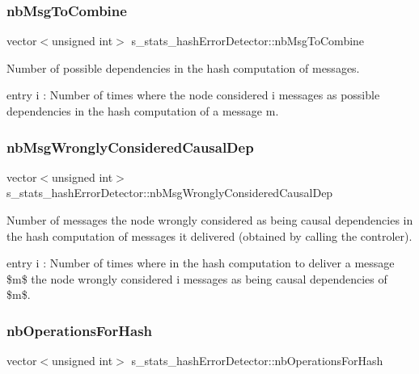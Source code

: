 \subsubsection{\texorpdfstring{nb\+Msg\+To\+Combine}{nbMsgToCombine}}
{\footnotesize\ttfamily vector$<$unsigned int$>$ s\+\_\+stats\+\_\+hash\+Error\+Detector\+::nb\+Msg\+To\+Combine}



Number of possible dependencies in the hash computation of messages. 

entry i \+: Number of times where the node considered i messages as possible dependencies in the hash computation of a message m. \mbox{\label{structs__stats__hash_error_detector_ac8f99ce678b3938dc049ff074040b999}} 
\subsubsection{\texorpdfstring{nb\+Msg\+Wrongly\+Considered\+Causal\+Dep}{nbMsgWronglyConsideredCausalDep}}
{\footnotesize\ttfamily vector$<$unsigned int$>$ s\+\_\+stats\+\_\+hash\+Error\+Detector\+::nb\+Msg\+Wrongly\+Considered\+Causal\+Dep}



Number of messages the node wrongly considered as being causal dependencies in the hash computation of messages it delivered (obtained by calling the controler). 

entry i \+: Number of times where in the hash computation to deliver a message \$m\$ the node wrongly considered i messages as being causal dependencies of \$m\$. \mbox{\label{structs__stats__hash_error_detector_a64dab27e3314cfc2a233f620f0309782}} 
\subsubsection{\texorpdfstring{nb\+Operations\+For\+Hash}{nbOperationsForHash}}
{\footnotesize\ttfamily vector$<$unsigned int$>$ s\+\_\+stats\+\_\+hash\+Error\+Detector\+::nb\+Operations\+For\+Hash}



